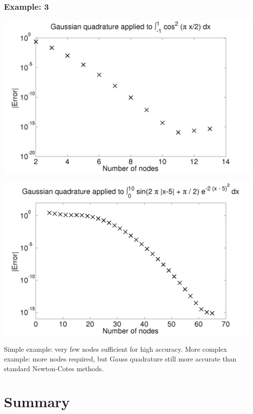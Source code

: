 \documentclass{beamer}
\begin{document}
\begin{frame}
  \frametitle{Example: 3}

  \begin{overlayarea}{\textwidth}{0.6\textheight}
    {
      \begin{center}
        \includegraphics[height=0.6\textheight]{figures/Gauss1}
      \end{center}
    }
    {
      \begin{center}
        \includegraphics[height=0.6\textheight]{figures/Gauss2}
      \end{center}
    }
  \end{overlayarea}
  Simple example: very few nodes sufficient for high accuracy. \pause
  More complex example: more nodes required, but Gauss quadrature
  still more accurate than standard Newton-Cotes methods.
\end{frame}

\section{Summary}
\end{document}
